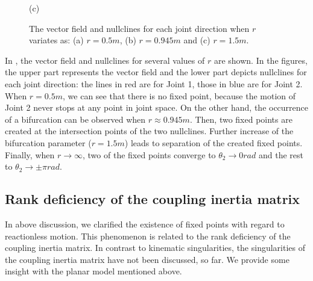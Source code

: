 \begin{figure}[t]
\begin{minipage}[t]{0.30\linewidth}
    \footnotesize\par{(c)}
    \hspace{2mm}
  \end{minipage}
  \caption{The vector field and nullclines for each joint direction when $r$ variates as: 
    (a) $r = 0.5\unit{m}$, (b) $r = 0.945\unit{m}$ and (c) $r = 1.5\unit{m}$.}
    \label{fig:BIF_VEC}
\end{figure}
%
In ,  the vector field and nullclines for  several values of $r$ are shown.
In the figures, the upper part represents the vector field and
the lower part depicts nullclines for each joint direction:
the lines in red are for Joint 1, those  in blue are  for Joint 2. 
When $r = 0.5\unit{m}$, we can see that there is no fixed point,
because the motion of Joint 2 never stops at any point in joint space.
On the other hand, the occurrence of a bifurcation can be observed when 
$r \approx 0.945\unit{m}$.
Then, two fixed points are created at the intersection points of the two nullclines.
Further increase of the bifurcation parameter ($r = 1.5\unit{m}$) 
leads to separation of the created fixed points. 
Finally, when $r \rightarrow \infty$, two of the fixed points converge to
$\theta_{2} \rightarrow 0\unit{rad}$ and
the rest  to $\theta_{2} \rightarrow \pm\pi\unit{rad}$.

\subsection{Rank deficiency of the coupling inertia matrix}
\label{sec:ANALYSIS_SING}
In above discussion, we clarified the existence of fixed points with regard to reactionless motion.
This phenomenon is related to the rank deficiency of the coupling inertia matrix.
In contrast to kinematic singularities, the singularities of the coupling inertia matrix have 
not been discussed, so far. We provide some insight with the planar model mentioned above.

